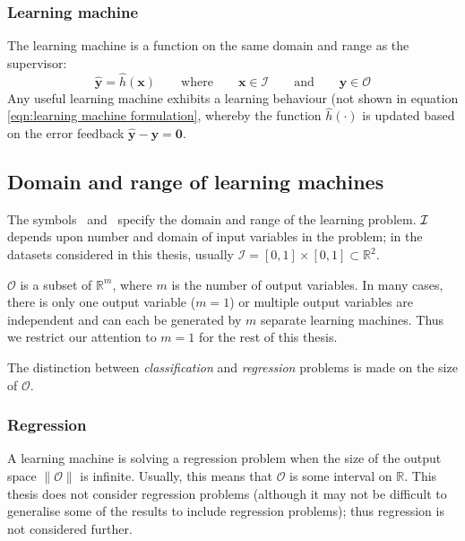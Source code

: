 \subsubsection{Learning machine}
\label{sec:learning machine}

The learning machine is a function on the same domain and
range as the supervisor:
%
\begin{equation}
\mathbf{\hat{y}} = \hat{h}(\mathbf{x}) \qquad \mbox{where} \qquad
\mathbf{x} \in \mathcal{I} \qquad \mbox{and} \qquad \mathbf{y} \in
\mathcal{O}
\label{eqn:learning machine formulation}
\end{equation}
%
Any useful learning machine exhibits a learning behaviour (not shown in
equation \ref{eqn:learning machine formulation}, whereby the function
$\hat{h}(\cdot)$ is updated based on the error feedback
$\mathbf{\hat{y} - y = 0}$.


\subsection{Domain and range of learning machines}

The symbols \calI\ and \calO\ specify the domain and
range of the learning problem.  $\mathcal{I}$ depends upon number and
domain of input variables in the problem; in the datasets considered in
this thesis, usually $\mathcal{I} = [0,1] \times [0,1] \subset
\mathbb{R}^2$.

$\mathcal{O}$ is a subset of $\mathbb{R}^m$, where $m$ is the number
of output variables.  In many cases, there is only one output
variable ($m=1$) or multiple output variables are independent and
can each be generated by $m$ separate learning machines.
Thus we restrict our attention to $m=1$ for the rest of this thesis.

The distinction between \emph{classification} and \emph{regression}
problems is made on the size of $\mathcal{O}$.


\subsubsection{Regression}
\label{sec:regression}

A learning machine is solving a regression problem when the size of
the output space $\|\mathcal{O}\|$ is infinite.  Usually, this means
that $\mathcal{O}$ is some interval on $\mathbb{R}$.  This thesis does
not consider regression problems (although it may not be difficult to 
generalise some of the results to include regression problems); thus
regression is not considered further.


